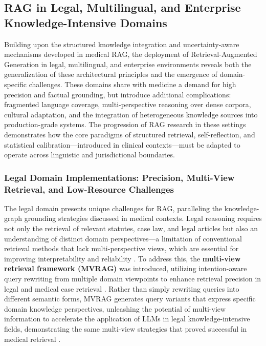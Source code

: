 \documentclass[11pt]{article}
\begin{document}
\subsection{RAG in Legal, Multilingual, and Enterprise Knowledge-Intensive Domains}

Building upon the structured knowledge integration and uncertainty-aware mechanisms developed in medical RAG, the deployment of Retrieval-Augmented Generation in legal, multilingual, and enterprise environments reveals both the generalization of these architectural principles and the emergence of domain-specific challenges. These domains share with medicine a demand for high precision and factual grounding, but introduce additional complications: fragmented language coverage, multi-perspective reasoning over dense corpora, cultural adaptation, and the integration of heterogeneous knowledge sources into production-grade systems. The progression of RAG research in these settings demonstrates how the core paradigms of structured retrieval, self-reflection, and statistical calibration---introduced in clinical contexts---must be adapted to operate across linguistic and jurisdictional boundaries.

\subsubsection{Legal Domain Implementations: Precision, Multi-View Retrieval, and Low-Resource Challenges}

The legal domain presents unique challenges for RAG, paralleling the knowledge-graph grounding strategies discussed in medical contexts. Legal reasoning requires not only the retrieval of relevant statutes, case law, and legal articles but also an understanding of distinct domain perspectives---a limitation of conventional retrieval methods that lack multi-perspective views, which are essential for improving interpretability and reliability \cite{ref182}. To address this, the \textbf{multi-view retrieval framework (MVRAG)} was introduced, utilizing intention-aware query rewriting from multiple domain viewpoints to enhance retrieval precision in legal and medical case retrieval \cite{ref182}. Rather than simply rewriting queries into different semantic forms, MVRAG generates query variants that express specific domain knowledge perspectives, unleashing the potential of multi-view information to accelerate the application of LLMs in legal knowledge-intensive fields, demonstrating the same multi-view strategies that proved successful in medical retrieval \cite{ref182}.
\end{document}
